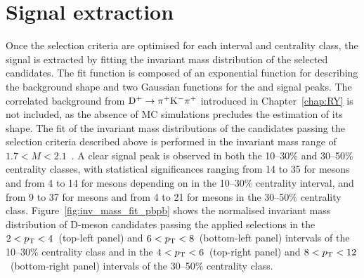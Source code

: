 \section{Signal extraction}
Once the selection criteria are optimised for each \pt interval and centrality class, the signal is extracted by fitting the invariant mass distribution of the selected candidates. The fit function is composed of an exponential function for describing the background shape and two Gaussian functions for the \ds and \dpl signal peaks. The correlated background from $\mathrm{D^+} \rightarrow \mathrm{\pi^+K^-\pi^+}$ introduced in Chapter~\ref{chap:RY} is not included, as the absence of MC simulations precludes the estimation of its shape. The fit of the invariant mass distributions of the candidates passing the selection criteria described above is performed in the invariant mass range of $1.7 < M < 2.1$~\gevcc. A clear signal peak is observed in both the 10--30\% and 30--50\% centrality classes, with statistical significances ranging from 14 to 35 for \ds mesons and from 4 to 14 for \dpl mesons depending on \pt in the 10--30\% centrality interval, and from 9 to 37 for \ds mesons and from 4 to 21 for \dpl mesons in the 30--50\% centrality class. Figure~\ref{fig:inv_mass_fit_pbpb} shows the normalised invariant mass distribution of D-meson candidates passing the applied selections in the $2<p_\mathrm{T}<4$~\gevc (top-left panel) and $6<p_\mathrm{T}<8$~\gevc (bottom-left panel) intervals of the 10--30\% centrality class and in the $4<p_\mathrm{T}<6$~\gevc (top-right panel) and $8<p_\mathrm{T}<12$~\gevc (bottom-right panel) intervals of the 30--50\% centrality class. 

